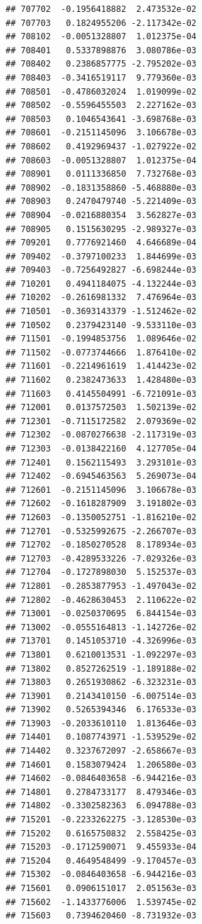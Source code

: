\documentclass[ignorenonframetext,]{beamer}
\begin{document}
\begin{frame}[fragile]
\begin{verbatim}
## 707702  -0.1956418882  2.473532e-02
## 707703   0.1824955206 -2.117342e-02
## 708102  -0.0051328807  1.012375e-04
## 708401   0.5337898876  3.080786e-03
## 708402   0.2386857775 -2.795202e-03
## 708403  -0.3416519117  9.779360e-03
## 708501  -0.4786032024  1.019099e-02
## 708502  -0.5596455503  2.227162e-03
## 708503   0.1046543641 -3.698768e-03
## 708601  -0.2151145096  3.106678e-03
## 708602   0.4192969437 -1.027922e-02
## 708603  -0.0051328807  1.012375e-04
## 708901   0.0111336850  7.732768e-03
## 708902  -0.1831358860 -5.468880e-03
## 708903   0.2470479740 -5.221409e-03
## 708904  -0.0216880354  3.562827e-03
## 708905   0.1515630295 -2.989327e-03
## 709201   0.7776921460  4.646689e-04
## 709402  -0.3797100233  1.844699e-03
## 709403  -0.7256492827 -6.698244e-03
## 710201   0.4941184075 -4.132244e-03
## 710202  -0.2616981332  7.476964e-03
## 710501  -0.3693143379 -1.512462e-02
## 710502   0.2379423140 -9.533110e-03
## 711501  -0.1994853756  1.089646e-02
## 711502  -0.0773744666  1.876410e-02
## 711601  -0.2214961619  1.414423e-02
## 711602   0.2382473633  1.428480e-03
## 711603   0.4145504991 -6.721091e-03
## 712001   0.0137572503  1.502139e-02
## 712301  -0.7115172582  2.079369e-02
## 712302  -0.0870276638 -2.117319e-03
## 712303  -0.0138422160  4.127705e-04
## 712401   0.1562115493  3.293101e-03
## 712402  -0.6945463563  5.269073e-04
## 712601  -0.2151145096  3.106678e-03
## 712602  -0.1618287909  3.191802e-03
## 712603  -0.1350052751 -1.816210e-02
## 712701  -0.5325992675 -2.266707e-03
## 712702  -0.1850270528  8.178934e-03
## 712703  -0.4289533226 -7.029326e-03
## 712704  -0.1727898030  5.152537e-03
## 712801  -0.2853877953 -1.497043e-02
## 712802  -0.4628630453  2.110622e-02
## 713001  -0.0250370695  6.844154e-03
## 713002  -0.0555164813 -1.142726e-02
## 713701   0.1451053710 -4.326996e-03
## 713801   0.6210013531 -1.092297e-03
## 713802   0.8527262519 -1.189188e-02
## 713803   0.2651930862 -6.323231e-03
## 713901   0.2143410150 -6.007514e-03
## 713902   0.5265394346  6.176533e-03
## 713903  -0.2033610110  1.813646e-03
## 714401   0.1087743971 -1.539529e-02
## 714402   0.3237672097 -2.658667e-03
## 714601   0.1583079424  1.206580e-03
## 714602  -0.0846403658 -6.944216e-03
## 714801   0.2784733177  8.479346e-03
## 714802  -0.3302582363  6.094788e-03
## 715201  -0.2233262275 -3.128530e-03
## 715202   0.6165750832  2.558425e-03
## 715203  -0.1712590071  9.455933e-04
## 715204   0.4649548499 -9.170457e-03
## 715302  -0.0846403658 -6.944216e-03
## 715601   0.0906151017  2.051563e-03
## 715602  -1.1433776006  1.539745e-02
## 715603   0.7394620460 -8.731932e-03

\end{verbatim}
\end{frame}
\end{document}
